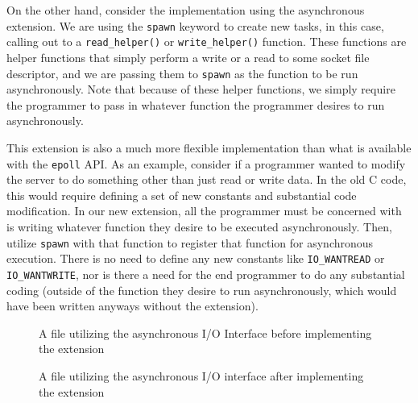\documentclass[main.tex]{subfiles}
\begin{document}
On the other hand, consider the implementation using the asynchronous extension. We are using the
\verb|spawn| keyword to create new tasks, in this case, calling out to a \verb|read_helper()| or \verb|write_helper()| function. These
functions are helper functions that simply perform a write or a read to some socket file descriptor, and we are passing them to 
\verb|spawn| as the function to be run asynchronously. Note that because of these helper functions, we simply require the programmer to pass in whatever function the programmer desires to run asynchronously.

This extension is also a much more flexible implementation than what is available with the \verb|epoll| API. As an example,
consider if a programmer wanted to modify the server to do something other than just read or write data. In the old C code, this would
require defining a set of new constants and substantial code modification. In our new extension, all the programmer must be concerned
with is writing whatever function they desire to be executed asynchronously. Then, utilize \verb|spawn| with that function to register that
function for asynchronous execution. There is no need to define any new constants like \verb|IO_WANTREAD| or \verb|IO_WANTWRITE|, 
nor is there a need for the end programmer to do any substantial coding (outside of the function they desire to run asynchronously, which
would have been written anyways without the extension).

\begin{figure}
	
	\caption{A file utilizing the asynchronous I/O Interface before implementing the extension}
\end{figure}
\begin{figure}
	
	\caption{A file utilizing the asynchronous I/O interface after implementing the extension}
\end{figure}
\end{document}
